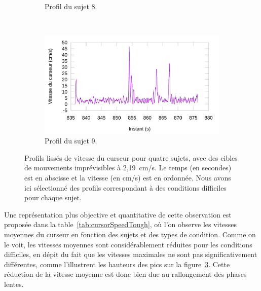 \begin{figure}[htb]
\begin{subfigure}[t]{\subImgWlineplot}
			\caption{Profil du sujet 8.}
			\label{fig:hardProfile8}
		\end{subfigure}
		~
		\begin{subfigure}[t]{\subImgWlineplot}
			\centering
			\includegraphics[width=\textwidth]{figures/ch4/subject_09_30_30_219_smoothed}
			\caption{Profil du sujet 9.}
			\label{fig:hardProfile9}
		\end{subfigure}
		\caption[Profils de vitesse du curseur, conditions]{Profils lissés de vitesse du curseur pour quatre sujets, avec des cibles de mouvements imprévisibles à 2,19~cm/s. Le temps (en secondes) est en abscisse et la vitesse (en cm/s) est en ordonnée. Nous avons ici sélectionné des profils correspondant à des conditions difficiles pour chaque sujet.}
		\label{fig:hardProfiles}
	\end{figure}
	
	Une représentation plus objective et quantitative de cette observation est proposée dans la table~\ref{tab:cursorSpeedTough}, où l'on observe les vitesses moyennes du curseur en fonction des sujets et des types de condition. Comme on le voit, les vitesses moyennes sont considérablement réduites pour les conditions difficiles, en dépit du fait que les vitesses maximales ne sont pas significativement différentes, comme l'illustrent les hauteurs des pics sur la figure~\ref{fig:hardProfiles}. Cette réduction de la vitesse moyenne est donc bien due au rallongement des phases lentes.
	
